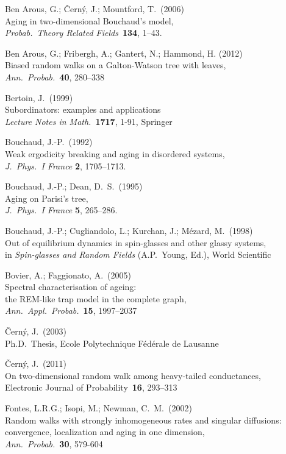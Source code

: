\begin{thebibliography}{xxxxxx 89}
 Ben Arous, G.; \v Cern\'y, J.; Mountford, T.~(2006)\\
Aging in two-dimensional Bouchaud's model,\\
{\em Probab.~Theory Related Fields}~{\bf 134}, 1--43.

 Ben Arous, G.; Fribergh, A.; Gantert, N.; Hammond, H. (2012)\\
Biased random walks on a Galton-Watson tree with leaves,\\ 
{\em Ann.~Probab.}~{\bf 40}, 280--338 

 Bertoin, J.~(1999)\\
Subordinators: examples and applications\\
{\em Lecture Notes in Math.}~{\bf 1717}, 1-91, Springer

 Bouchaud, J.-P.~(1992)\\
Weak ergodicity breaking and aging in disordered systems,\\
{\em J.~Phys.~I France} {\bf 2}, 1705--1713.

 Bouchaud, J.-P.; Dean, D.~S.~(1995)\\
Aging on Parisi's tree,\\
{\em J.~Phys.~I France} {\bf 5}, 265--286.

 Bouchaud, J.-P.; Cugliandolo, L.; Kurchan, J.; M\'{e}zard, M.~(1998)\\
Out of equilibrium dynamics in spin-glasses and other glassy systems,\\
in {\em Spin-glasses and Random Fields} (A.P.~Young, Ed.), World Scientific

 Bovier, A.; Faggionato, A.~(2005)\\
Spectral characterisation of ageing:\\ 
the REM-like trap model in the complete graph,\\
{\em Ann.~Appl.~Probab.}~{\bf 15}, 1997--2037 

 \v Cern\'y, J.~(2003)\\
Ph.D.~Thesis, Ecole Polytechnique F\' ed\' erale de Lausanne

 \v Cern\'y, J.~(2011)\\
On two-dimensional random walk among heavy-tailed conductances,\\
Electronic Journal of Probability~{\bf 16}, 293--313

 Fontes, L.R.G.; Isopi, M.; Newman, C.~M.~(2002)\\
Random walks with strongly inhomogeneous rates and singular diffusions:\\ 
convergence, localization and aging in one dimension,\\
{\em Ann.~Probab.}~{\bf 30}, 579-604


\end{thebibliography}
